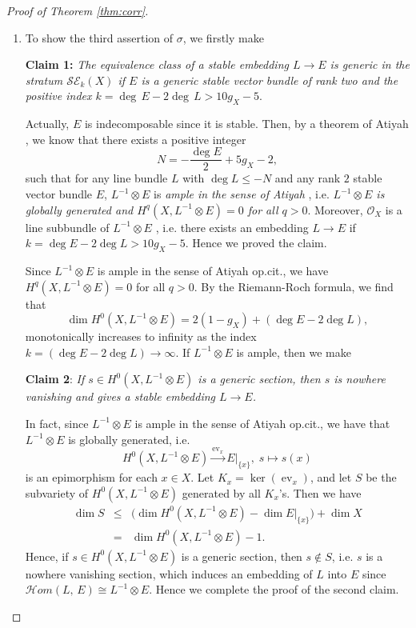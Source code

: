 \documentclass[12pt]{article}
\begin{document}
\begin{proof}[Proof of Theorem \ref{thm:corr}]
\begin{enumerate}
\item To show the third assertion of $\sigma$, we firstly make

\vspace{5pt}
{\bfseries Claim 1:} {\it The equivalence class of a stable embedding $L \to E$ is {\it generic} in the stratum $\mathcal{SE}_k(X)$ if $E$ is a generic stable vector bundle of rank two and the positive index $k=\deg\,E - 2\deg\, L > 10g_{X} - 5$}.
\vspace{5pt}

Actually, $E$ is indecomposable since it is stable. Then, by a theorem of Atiyah \cite[Theorem 1]{Atiyah57II}, we know that there exists a positive integer
\[ N = - \frac{\deg E}{2} + 5g_{X} - 2, \]
such that for any line bundle $L$ with $\deg L \leq - N$ and any rank $2$ stable vector bundle $E$, $L^{-1} \otimes E$ is {\it ample in the sense of Atiyah} \cite[p.417]{Atiyah57II}, i.e. {\it $L^{-1} \otimes E$ is globally generated and $ H^{q}(X, L^{-1} \otimes E) = 0$ for all $q > 0$}. Moreover, $\mathcal{O}_{X}$ is a line subbundle of $L^{-1} \otimes E$ \cite[Theorem 2]{Atiyah57II}, i.e. there exists an embedding $L\to E$ if $k = \deg E - 2 \deg L > 10g_{X} - 5$. Hence we proved the claim.


Since $L^{-1} \otimes E$ is ample in the sense of Atiyah op.cit., we have $ H^{q}(X, L^{-1} \otimes E) = 0$ for all $q > 0$. By the Riemann-Roch formula, we find that
\[ \dim H^{0}(X, L^{-1} \otimes E) = 2(1 - g_{X}) + (\deg E - 2 \deg L), \]
monotonically increases to infinity as the index $k=(\deg E - 2 \deg L)\to\infty$.
If $L^{-1} \otimes E$ is ample, then we make

\vspace{5pt}
{\bfseries Claim 2}: {\it If $s \in H^{0}(X, L^{-1} \otimes E)$ is a generic section, then $s$ is nowhere vanishing and gives a stable embedding $L\to E$.}
\vspace{5pt}

In fact, since $L^{-1}\otimes E$ is ample in the sense of Atiyah op.cit., we have that $L^{-1}\otimes E$ is globally generated, i.e. $$H^{0}(X, L^{-1} \otimes E) \xrightarrow{\operatorname{ev}_{x}} E|_{\{x\}},\; s \mapsto s(x)$$ is an epimorphism for each $x \in X$. Let $K_{x} = \ker (\operatorname{ev}_{x})$, and let $S$ be the subvariety of  $H^{0}(X, L^{-1} \otimes E)$ generated by all $K_{x}$'s. Then we have
\begin{eqnarray*}
\dim S &\leq& \Big(\dim H^{0}(X, L^{-1} \otimes E) - \dim E|_{\{x\}}\Big) + \dim X \\&=&
 \dim H^{0}(X, L^{-1} \otimes E) - 1.
 \end{eqnarray*}
Hence, if $s \in H^{0}(X, L^{-1} \otimes E)$ is a generic section, then $s \notin S$, i.e. $s$ is a nowhere vanishing section, which induces an embedding of $L$ into $E$ since $\mathcal{H}om(L,\,E)\cong L^{-1}\otimes E$.
Hence we complete the proof of the second claim.


\end{enumerate}
\end{proof}
\end{document}
